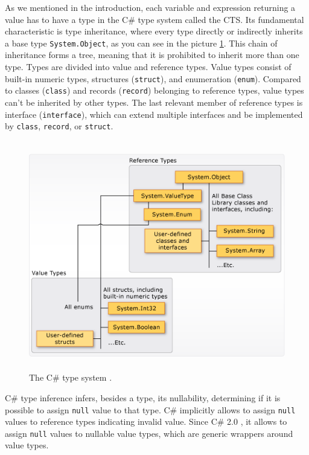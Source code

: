 As we mentioned in the introduction, each variable and expression returning a value has to have a type in the C\# type system \cite{online:cSharpTypeSystem} called the \ac{CTS}.
Its fundamental characteristic is type inheritance, where every type directly or indirectly inherits a base type \texttt{System.Object}, as you can see in the picture \ref{img04:typeSys}.
This chain of inheritance forms a tree, meaning that it is prohibited to inherit more than one type.
Types are divided into value and reference types.
Value types consist of built-in numeric types, structures (\texttt{struct}), and enumeration (\texttt{enum}).
Compared to classes (\texttt{class}) and records (\texttt{record}) belonging to reference types, value types can't be inherited by other types.
The last relevant member of reference types is interface (\texttt{interface}), which can extend multiple interfaces and be implemented by \texttt{class}, \texttt{record}, or \texttt{struct}.
\par
\begin{figure}[b!]
\centering
\includegraphics[width=140mm, height=100mm]{./img/value-reference-types-common-type-system.png}
\caption{The C\# type system \cite{online:cSharpTypeSystem}.}
\label{img04:typeSys}
\end{figure}
\par
{}
C\# type inference infers, besides a type, its nullability, determining if it is possible to assign \texttt{null} value to that type.
C\# implicitly allows to assign \texttt{null} values to reference types indicating invalid value.
Since C\# 2.0 \cite{online:csHist}, it allows to assign \texttt{null} values to nullable value types, which are generic wrappers around value types.
